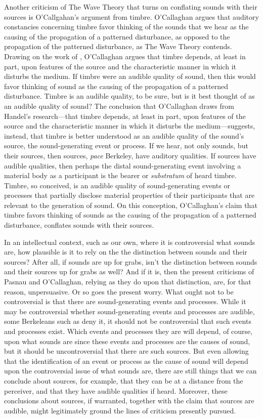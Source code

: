 Another criticism of The Wave Theory that turns on conflating sounds with their sources is O'Callgahan's \citeyearpar[89]{OCallaghan:2007xy} argument from timbre. O'Callaghan argues that auditory constancies concerning timbre favor thinking of the sounds that we hear as the causing of the propagation of a patterned disturbance, as opposed to the propagation of the patterned disturbance, as The Wave Theory contends. Drawing on the work of \citet{Handel:1995aa}, O'Callaghan argues that timbre depends, at least in part, upon features of the source and the characteristic manner in which it disturbs the medium. If timbre were an audible quality of sound, then this would favor thinking of sound as the causing of the propagation of a patterned disturbance. Timbre is an audible quality, to be sure, but is it best thought of as an audible quality of sound? The conclusion that O'Callaghan draws from Handel's research---that timbre depends, at least in part, upon features of the source and the characteristic manner in which it disturbs the medium---suggests, instead, that timbre is better understood as an audible quality of the sound's source, the sound-generating event or process. If we hear, not only sounds, but their sources, then sources, \emph{pace} Berkeley, have auditory qualities. If sources have audible qualities, then perhaps the distal sound-generating event involving a material body as a participant is the bearer or \emph{substratum} of heard timbre. Timbre, so conceived, is an audible quality of sound-generating events or processes that partially disclose material properties of their participants that are relevant to the generation of sound. On this conception, O'Callaghan's claim that timbre favors thinking of sounds as the causing of the propagation of a patterned disturbance, conflates sounds with their sources.

In an intellectual context, such as our own, where it is controversial what sounds are, how plausible is it to rely on the the distinction between sounds and their sources? After all, if sounds are up for grabs, isn't the distinction between sounds and their sources up for grabs as well? And if it is, then the present criticisms of Pasnau and O'Callaghan, relying as they do upon that distinction, are, for that reason, unpersuasive. Or so goes the present worry. What ought not to be controversial is that there are sound-generating events and processes. While it may be controversial whether sound-generating events and processes are audible, some Berkeleans such as \citet{Smith:2002sa} deny it, it should not be controversial that such events and processes exist. Which events and processes they are will depend, of course, upon what sounds are since these events and processes are the causes of sound, but it should be uncontroversial that there are such sources. But even allowing that the identification of an event or process as the cause of sound will depend upon the controversial issue of what sounds are, there are still things that we can conclude about sources, for example, that they can be at a distance from the perceiver, and that they have audible qualities if heard. Moreover, these conclusions about sources, if warranted, together with the claim that sources are audible, might legitimately ground the lines of criticism presently pursued.

